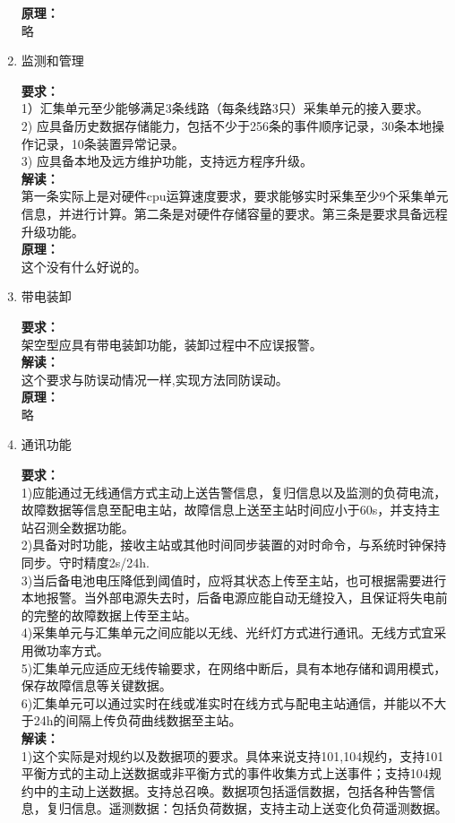 \documentclass{article}
\begin{document}
\begin{CJK}{UTF8}{gbsn}
\begin{enumerate}
	\textbf{原理：}\\
	略
\item 监测和管理
	\par
	\textbf{要求：}\\
	1）汇集单元至少能够满足3条线路（每条线路3只）采集单元的接入要求。\\
	2) 应具备历史数据存储能力，包括不少于256条的事件顺序记录，30条本地操作记录，10条装置异常记录。\\
	3) 应具备本地及远方维护功能，支持远方程序升级。\\
	\textbf{解读：}\\
	第一条实际上是对硬件cpu运算速度要求，要求能够实时采集至少9个采集单元信息，并进行计算。第二条是对硬件存储容量的要求。第三条是要求具备远程升级功能。\\
	\textbf{原理：}\\
	这个没有什么好说的。
\item 带电装卸
	\par
	\textbf{要求：}\\
	架空型应具有带电装卸功能，装卸过程中不应误报警。\\
	\textbf{解读：}\\
	这个要求与防误动情况一样,实现方法同防误动。\\
	\textbf{原理：}\\
	略
\item 通讯功能
	\par
	\textbf{要求：}\\
	1)应能通过无线通信方式主动上送告警信息，复归信息以及监测的负荷电流，故障数据等信息至配电主站，故障信息上送至主站时间应小于60s，并支持主站召测全数据功能。\\
	2)具备对时功能，接收主站或其他时间同步装置的对时命令，与系统时钟保持同步。守时精度2s/24h.\\
	3)当后备电池电压降低到阈值时，应将其状态上传至主站，也可根据需要进行本地报警。当外部电源失去时，后备电源应能自动无缝投入，且保证将失电前的完整的故障数据上传至主站。\\
	4)采集单元与汇集单元之间应能以无线、光纤灯方式进行通讯。无线方式宜采用微功率方式。\\
	5)汇集单元应适应无线传输要求，在网络中断后，具有本地存储和调用模式，保存故障信息等关键数据。\\
	6)汇集单元可以通过实时在线或准实时在线方式与配电主站通信，并能以不大于24h的间隔上传负荷曲线数据至主站。\\
	\textbf{解读：}\\
	1)这个实际是对规约以及数据项的要求。具体来说支持101,104规约，支持101平衡方式的主动上送数据或非平衡方式的事件收集方式上送事件；支持104规约中的主动上送数据。支持总召唤。数据项包括遥信数据，包括各种告警信息，复归信息。遥测数据：包括负荷数据，支持主动上送变化负荷遥测数据。\\

\end{enumerate}
\end{CJK}
\end{document}

